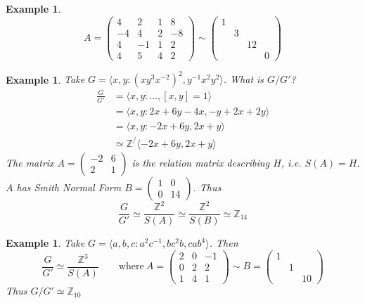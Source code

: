 \documentclass[a4paper,10pt]{article}
\newcommand{\ZZ}{\mathbb{Z}}
\newtheorem{eg}[thm]{Example}
\begin{document}
\begin{eg}
\[ A = \begin{pmatrix} 4 & 2 & 1 & 8 \\
                    -4 & 4 & 2 & -8 \\
                    4 & -1 & 1 & 2 \\
                    4 & 5 & 4 & 2
 \end{pmatrix} \sim \begin{pmatrix} 1 \\
                                    & 3 \\
                                    & & 12 \\
                                    & & & 0 
 \end{pmatrix}
 \]
\end{eg}

\begin{eg}
Take $G = \langle x,y : (xy^3x^{-2})^2, y^{-1} x^2 y^2 \rangle$. What is $G / G'$?
\begin{align*}
\frac{G}{G'} &= \langle x,y : \dots, [x,y] = 1 \rangle \\
             &= \langle x,y : 2x + 6y - 4x, -y + 2x + 2y \rangle  \\
             &= \langle x,y : -2x + 6y, 2x + y \rangle \\
             &\simeq \ZZ^ / \langle -2x + 6y, 2x + y \rangle 
\end{align*}
The matrix $A = \begin{pmatrix} -2 & 6 \\ 2 & 1 \end{pmatrix}$ is the relation matrix describing $H$, i.e. $S(A) = H$. $A$ has Smith Normal Form $B = \begin{pmatrix} 1 & 0 \\ 0 & 14 \end{pmatrix}$. Thus
\[ \frac{G}{G'} \simeq \frac{\ZZ^2}{S(A)} \simeq \frac{\ZZ^2}{S(B)} \simeq \ZZ_{14} \] 
\end{eg}

\begin{eg}
Take $G = \langle a,b,c : a^2c^{-1}, bc^2b, cab^4 \rangle$. Then 
\[ \frac{G}{G'} \simeq \frac{\ZZ^3}{S(A)} \qquad \text{where} \ A = \begin{pmatrix} 2 & 0 & -1 \\
  0 & 2 & 2 \\ 1 & 4 & 1
 \end{pmatrix} \sim B = \begin{pmatrix} 1 \\ & 1 \\ & & 10 \end{pmatrix} \]
 Thus $G / G' \simeq \ZZ_{10}$
\end{eg}
\end{document}
